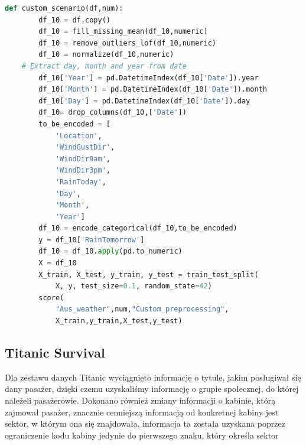 \documentclass{book}
\begin{document}
\begin{lstlisting}[language=Python, caption={Indywidualny 
    scenariusz dla zestawu danych Aus Weather}, captionpos=b]
    def custom_scenario(df,num):
        df_10 = df.copy()
        df_10 = fill_missing_mean(df_10,numeric)
        df_10 = remove_outliers_lof(df_10,numeric)
        df_10 = normalize(df_10,numeric)
    # Extract day, month and year from date
        df_10['Year'] = pd.DatetimeIndex(df_10['Date']).year
        df_10['Month'] = pd.DatetimeIndex(df_10['Date']).month
        df_10['Day'] = pd.DatetimeIndex(df_10['Date']).day
        df_10= drop_columns(df_10,['Date'])
        to_be_encoded = [
            'Location',
            'WindGustDir',
            'WindDir9am',
            'WindDir3pm',
            'RainToday',
            'Day',
            'Month',
            'Year']
        df_10 = encode_categorical(df_10,to_be_encoded)
        y = df_10['RainTomorrow']
        df_10 = df_10.apply(pd.to_numeric)
        X = df_10
        X_train, X_test, y_train, y_test = train_test_split(
            X, y, test_size=0.1, random_state=42)
        score(
            "Aus_weather",num,"Custom_preprocessing",
            X_train,y_train,X_test,y_test)
\end{lstlisting}

\subsection{Titanic Survival}
Dla zestawu danych Titanic wyciągnięto informację o tytule, 
jakim posługiwał się dany pasażer, dzięki czemu uzyskaliśmy 
informację o grupie społecznej, do której należeli pasażerowie. 
Dokonano również zmiany informacji o kabinie, którą zajmował pasażer, 
znacznie cenniejszą informacją od konkretnej kabiny jest sektor, 
w którym ona się znajdowała, informacja ta została uzyskana poprzez 
ograniczenie kodu kabiny jedynie do pierwszego znaku, który 
określa sektor
\end{document}
